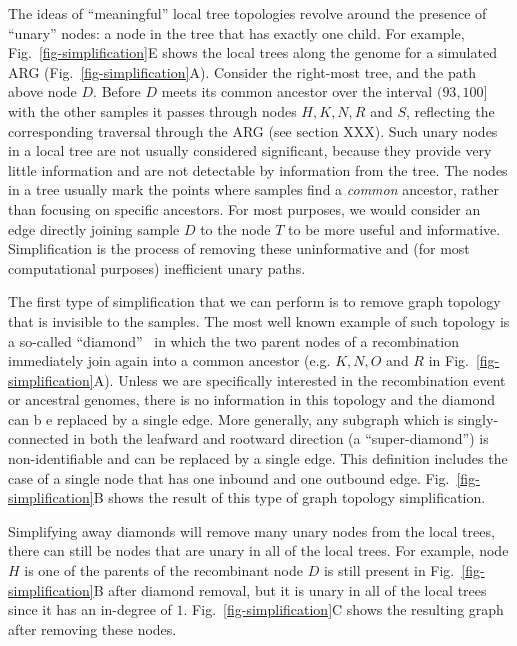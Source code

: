 \documentclass{article}
\begin{document}
The ideas of ``meaningful'' local tree topologies revolve around the
presence of ``unary'' nodes: a node in the tree that has exactly
one child. For example, Fig.~\ref{fig-simplification}E shows the
local trees along the genome for a simulated ARG
(Fig.~\ref{fig-simplification}A). Consider the right-most tree,
and the path above node $D$. Before $D$ meets its common ancestor
over the interval $(93, 100]$ with the other samples it passes through
nodes $H, K, N, R$ and $S$, reflecting the corresponding
traversal through the ARG (see section XXX). Such unary nodes
in a local tree are not usually considered significant,
because they provide very little information and are not
detectable by information from the tree. %
The nodes in a tree usually mark the points where samples find a
\emph{common} ancestor, rather than focusing on specific
ancestors. For most purposes, we would consider an edge
directly joining sample $D$ to the node $T$ to be more
useful and informative. Simplification is the process of removing
these uninformative and (for most computational purposes)
inefficient unary paths.

The first type of simplification that we can perform is to remove
graph topology that is invisible to the samples. The most well
known example of such topology is a so-called
``diamond''~\citep{rasmussen2014genome}
in which the two parent nodes of a recombination immediately
join again into a common ancestor (e.g. $K,N,O$ and $R$ in
Fig.~\ref{fig-simplification}A).
Unless we are specifically
interested in the recombination event or ancestral genomes,
there is no information in this topology and the diamond can b
e replaced by a single edge. More generally, any
subgraph which is singly-connected in both the leafward and
rootward direction (a ``super-diamond'') is non-identifiable and can be
replaced by a single edge. This definition includes the case
of a single node that has one inbound and one outbound edge.
Fig.~\ref{fig-simplification}B shows the result of this type of
graph topology simplification.

Simplifying away diamonds will remove many unary nodes from the
local trees, there can still be nodes that are unary in all
of the local trees. For example, node $H$ is one of the
parents of the recombinant node $D$ is still present in
Fig.~\ref{fig-simplification}B after diamond removal, but
it is unary in all of the local trees since it has an
in-degree of $1$.
Fig.~\ref{fig-simplification}C shows the resulting graph
after removing these nodes.
\end{document}
